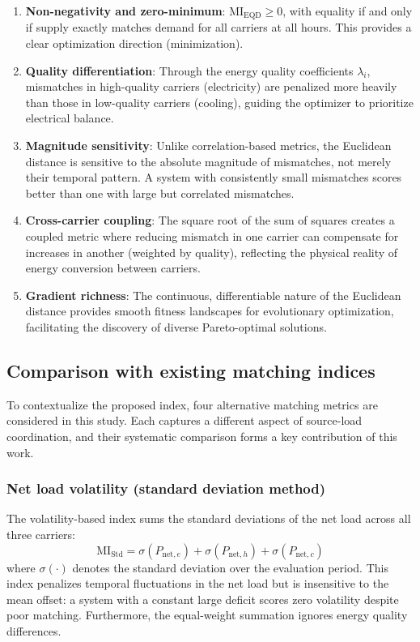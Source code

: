 \begin{enumerate}
    \item \textbf{Non-negativity and zero-minimum}: $\text{MI}_{\text{EQD}} \geq 0$, with equality if and only if supply exactly matches demand for all carriers at all hours. This provides a clear optimization direction (minimization).
    \item \textbf{Quality differentiation}: Through the energy quality coefficients $\lambda_i$, mismatches in high-quality carriers (electricity) are penalized more heavily than those in low-quality carriers (cooling), guiding the optimizer to prioritize electrical balance.
    \item \textbf{Magnitude sensitivity}: Unlike correlation-based metrics, the Euclidean distance is sensitive to the absolute magnitude of mismatches, not merely their temporal pattern. A system with consistently small mismatches scores better than one with large but correlated mismatches.
    \item \textbf{Cross-carrier coupling}: The square root of the sum of squares creates a coupled metric where reducing mismatch in one carrier can compensate for increases in another (weighted by quality), reflecting the physical reality of energy conversion between carriers.
    \item \textbf{Gradient richness}: The continuous, differentiable nature of the Euclidean distance provides smooth fitness landscapes for evolutionary optimization, facilitating the discovery of diverse Pareto-optimal solutions.
\end{enumerate}

\subsection{Comparison with existing matching indices}
\label{sec:comparison_indices}

To contextualize the proposed index, four alternative matching metrics are considered in this study. Each captures a different aspect of source-load coordination, and their systematic comparison forms a key contribution of this work.

\subsubsection{Net load volatility (standard deviation method)}

The volatility-based index sums the standard deviations of the net load across all three carriers:
\begin{equation}
    \text{MI}_{\text{Std}} = \sigma(P_{\text{net},e}) + \sigma(P_{\text{net},h}) + \sigma(P_{\text{net},c})
    \label{eq:mi_std}
\end{equation}
where $\sigma(\cdot)$ denotes the standard deviation over the evaluation period. This index penalizes temporal fluctuations in the net load but is insensitive to the mean offset: a system with a constant large deficit scores zero volatility despite poor matching. Furthermore, the equal-weight summation ignores energy quality differences.

